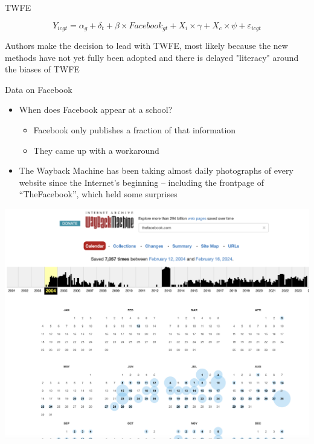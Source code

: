 \documentclass{beamer}
\begin{document}
\begin{frame}{TWFE}

\begin{equation}
Y_{icgt} = \alpha_g + \delta_t + \beta \times Facebook_{gt} + X_i \times \gamma + X_c \times \psi + \varepsilon_{icgt}
\end{equation}

\bigskip

Authors make the decision to lead with TWFE, most likely because the new methods have not yet fully been adopted and there is delayed "literacy" around the biases of TWFE

\end{frame}


\begin{frame}{Data on Facebook}

\begin{itemize}

\item When does Facebook appear at a school?  
	\begin{itemize}
	\item Facebook only publishes a fraction of that information
	\item They came up with a workaround
	\end{itemize}
\item The Wayback Machine has been taking almost daily photographs of every website since the Internet's beginning -- including the frontpage of ``TheFacebook'', which held some surprises


\end{itemize}

\end{frame}

\begin{frame}
\begin{center}
\includegraphics[scale=0.25]{./lecture_includes/wayback1}
\end{center}
\end{frame}
\end{document}
